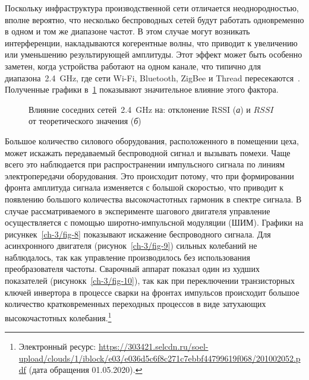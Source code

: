 Поскольку инфраструктура производственной сети отличается неоднородностью, вполне вероятно, что несколько беспроводных сетей будут работать одновременно в одном и том же диапазоне частот. В этом случае могут возникать интерференции, накладываются когерентные волны, что приводит к увеличению или уменьшению результирующей амплитуды. Этот эффект может быть особенно заметен, когда устройства работают на одном канале, что типично для диапазона~\SI{2,4}{\giga \hertz}, где сети Wi-Fi, Bluetooth, ZigBee и Thread пересекаются~\cite{016461}. Полученные графики в~\cref{ch-3/fig-7} показывают значительное влияние этого фактора.

\begin{figure} [htb]
	\caption[Влияние соседних сетей~\SI{2,4}{\giga \hertz} на: отклонение RSSI и $RSSI$ от теоретического значения]
	{Влияние соседних сетей~\SI{2,4}{\giga \hertz} на: отклонение RSSI (\textit{а}) и $RSSI$ от теоретического значения (\textit{б})}
	\label{ch-3/fig-7}
\end{figure}

Большое количество силового оборудования, расположенного в помещении цеха, может искажать передаваемый беспроводной сигнал и вызывать помехи. Чаще всего это наблюдается при распространении импульсного сигнала по линиям электропередачи оборудования. Это происходит потому, что при формировании фронта амплитуда сигнала изменяется с большой скоростью, что приводит к появлению большого количества высокочастотных гармоник в спектре сигнала. В случае рассматриваемого в эксперименте шагового двигателя управление осуществляется с помощью широтно-импульсной модуляции (ШИМ). Графики на рисункек~\cref{ch-3/fig-8} показывают искажение беспроводного сигнала. Для асинхронного двигателя (рисунок~\cref{ch-3/fig-9}) сильных колебаний не наблюдалось, так как управление производилось без использования преобразователя частоты. Сварочный аппарат показал один из худших показателей (рисунокк~\cref{ch-3/fig-10}), так как при переключении транзисторных ключей инвертора в процессе сварки на фронтах импульсов происходит большое количество кратковременных переходных процессов в виде затухающих высокочастотных колебания.\footnote{Электронный ресурс: {\tiny\url{https://303421.selcdn.ru/soel-upload/clouds/1/iblock/e03/e036d5c6f8c271c7ebbf44799619f068/201002052.pdf}} (дата обращения 01.05.2020).}

